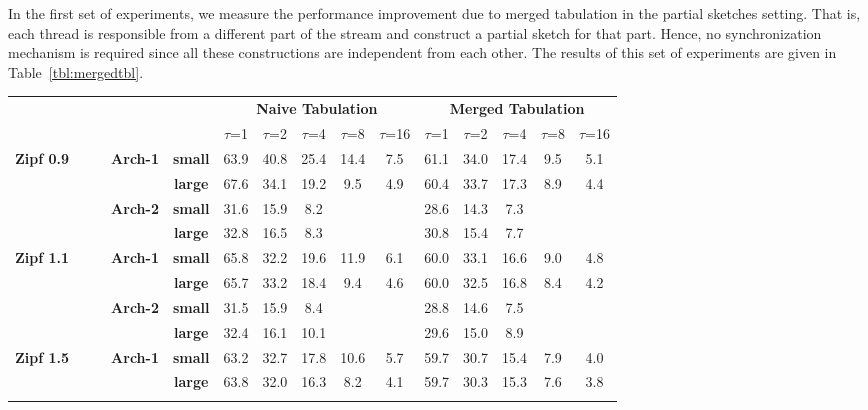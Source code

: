 \documentclass[10pt, conference, compsocconf]{IEEEtran}
\begin{document}
In the first set of experiments, we measure the performance improvement due to merged tabulation in the partial sketches setting. That is, each thread is responsible from a different part of the stream and construct a partial sketch for that part. Hence, no synchronization mechanism is required since all these constructions are independent from each other. The results of this set of experiments are given in Table~\ref{tbl:mergedtbl}. 

\begin{table}[htbp]
\centering
{\def\arraystretch{1.3}
\begin{tabular}{ccccc||ccccc|ccccc}  
                                 &&&&                 & \multicolumn{5}{c|}{\textbf{Naive Tabulation}} & \multicolumn{5}{c}{\textbf{Merged Tabulation}} \\
                                   &&&&                 & $\tau$=1   & $\tau$=2    & $\tau$=4    & $\tau$=8    & $\tau$=16  & $\tau$=1   & $\tau$=2   & $\tau$=4   & $\tau$=8   & $\tau$=16 \\ \hline
                                   

\multicolumn{1}{l}{\multirow{4}{*}{\textbf{Zipf 0.9}}}
&&&\multirow{2}{*}{\textbf{Arch-1}} & \textbf{small}  & 63.9    & 40.8   & 25.4   & 14.4   & 7.5   & 61.1    & 34.0    & 17.4   & 9.5   & 5.1   \\
                                 &&&& \textbf{large} & 67.6    & 34.1   & 19.2   &   9.5 & 4.9   &  60.4 &	33.7 &	17.3	& 8.9	& 4.4 \\ \cline{2-15}
             
&&&\multirow{2}{*}{\textbf{Arch-2}} & \textbf{small}  & 31.6    & 15.9   & 8.2   &        &       &  28.6    &  14.3   & 7.3   &        &       \\
                                 &&&& \textbf{large} &  32.8      &   16.5     &       8.3 &        &       &     30.8    &     15.4    &     7.7   &        &   \\ \hline  
\multicolumn{1}{l}{\multirow{4}{*}{\textbf{Zipf 1.1}}}
&&&\multirow{2}{*}{\textbf{Arch-1}} & \textbf{small}  & 65.8    & 32.2   & 19.6   & 11.9   & 6.1   & 60.0    & 33.1    & 16.6   & 9.0   & 4.8   \\
&&&& \textbf{large} & 65.7    & 33.2   & 18.4   &   9.4 & 4.6   &  60.0 &	32.5 &	16.8	& 8.4	& 4.2 \\ \cline{2-15}

&&&\multirow{2}{*}{\textbf{Arch-2}} & \textbf{small}  & 31.5    & 15.9   & 8.4   &        &       &  28.8    &  14.6   & 7.5   &        &       \\
&&&& \textbf{large} &  32.4      &   16.1     &       10.1 &        &       &     29.6    &     15.0    &     8.9   &        &   \\ \hline 
\multicolumn{1}{l}{\multirow{4}{*}{\textbf{Zipf 1.5}}}
&&&\multirow{2}{*}{\textbf{Arch-1}} & \textbf{small}  & 63.2    & 32.7   & 17.8   & 10.6   & 5.7   & 59.7    & 30.7    & 15.4   & 7.9   & 4.0   \\
&&&& \textbf{large} & 63.8    & 32.0   & 16.3   &   8.2 & 4.1   &  59.7 &	30.3 &	15.3	& 7.6	& 3.8 \\ \cline{2-15}


\end{tabular}}
\end{table}
\end{document}
